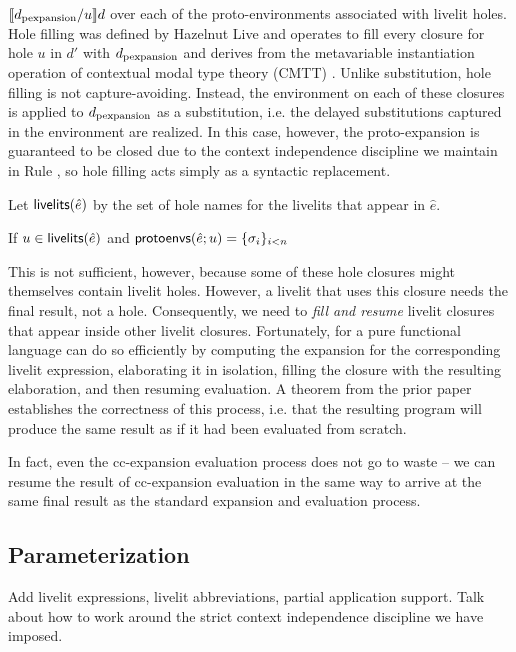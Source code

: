 $\llbracket d_\text{pexpansion} / u\rrbracket d$ over each of the proto-environments associated with livelit holes. 
Hole filling was defined by Hazelnut Live and operates to 
fill every closure for hole $u$ in $d'$ with $d_\text{pexpansion}$ and derives from the metavariable
instantiation operation of contextual modal type theory (CMTT) \cite{HazelnutLive,Nanevski2008}. 
Unlike substitution, hole filling is
not capture-avoiding. Instead, the environment on each of these closures is applied to $d_\text{pexpansion}$
as a substitution, i.e. the delayed substitutions captured in the environment are realized.
In this case, however, the proto-expansion is guaranteed to be closed due to 
the context independence discipline we maintain in Rule , 
so hole filling acts simply as a syntactic replacement.

Let $\mathsf{livelits}(\hat e)$ by the set of hole names for the livelits that appear in $\hat{e}$. 

\begin{definition}
    If $u \in \mathsf{livelits}(\hat e)$ and $\mathsf{protoenvs}(\hat e; u) = \{\sigma_i\}_{i < n}$ 
\end{definition}

This is not sufficient, however, because some of these hole closures might themselves 
contain livelit holes. However, a livelit that uses this closure needs the final result, 
not a hole. Consequently, we need to \emph{fill and resume} livelit closures that appear inside 
other livelit closures. Fortunately, for a pure functional language can do so efficiently 
by computing the expansion for the corresponding livelit expression, elaborating it in isolation,
filling the closure with the resulting elaboration, and then resuming evaluation. A theorem from
the prior paper establishes the correctness of this process, i.e. that the resulting program will 
produce the same result as if it had been evaluated from scratch.

In fact, even the cc-expansion evaluation process does not go to waste -- we can resume the 
result of cc-expansion evaluation in the same way to arrive at the same final result 
as the standard expansion and evaluation process.


\subsection{Parameterization}

Add livelit expressions, livelit abbreviations, 
partial application support. Talk about how to work around the strict context
independence discipline we have imposed.

